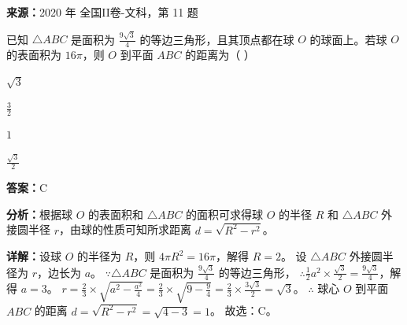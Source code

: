 \begin{question}[points=5]
\textbf{来源：}2020 年 全国II卷-文科，第 11 题\par
已知 $\triangle ABC$ 是面积为 $\frac{9\sqrt{3}}{4}$ 的等边三角形，且其顶点都在球 $O$ 的球面上。若球 $O$ 的表面积为 $16\pi$，则 $O$ 到平面 $ABC$ 的距离为（ ）
\begin{choices}
  \item $\sqrt{3}$
  \item $\frac{3}{2}$
  \item $1$
  \item $\frac{\sqrt{3}}{2}$
\end{choices}
\begin{solution}
\textbf{答案：}C

\textbf{分析：}根据球 $O$ 的表面积和 $\triangle ABC$ 的面积可求得球 $O$ 的半径 $R$ 和 $\triangle ABC$ 外接圆半径 $r$，由球的性质可知所求距离 $d=\sqrt{R^2-r^2}$。

\textbf{详解：}设球 $O$ 的半径为 $R$，则 $4\pi R^2=16\pi$，解得 $R=2$。
设 $\triangle ABC$ 外接圆半径为 $r$，边长为 $a$。
$\because \triangle ABC$ 是面积为 $\frac{9\sqrt{3}}{4}$ 的等边三角形，
$\therefore \frac{1}{2}a^2\times\frac{\sqrt{3}}{2} = \frac{9\sqrt{3}}{4}$，解得 $a=3$。
$r = \frac{2}{3}\times\sqrt{a^2-\frac{a^2}{4}} = \frac{2}{3}\times\sqrt{9-\frac{9}{4}} = \frac{2}{3}\times\frac{3\sqrt{3}}{2} = \sqrt{3}$。
$\therefore$ 球心 $O$ 到平面 $ABC$ 的距离 $d = \sqrt{R^2-r^2} = \sqrt{4-3} = 1$。
故选：C。
\end{solution}
\end{question}

